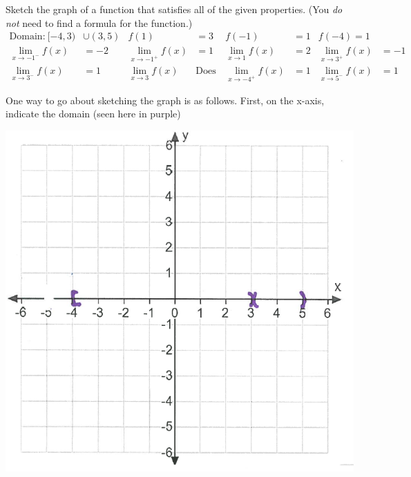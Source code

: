 \documentclass[nooutcomes]{ximera}
\begin{document}
					

\begin{problem}
Sketch the graph of a function that satisfies all of the given properties.
  (You \emph{do not} need to find a formula for the function.)
	\begin{align*}
	 \text{Domain:}\ [-4,3)&\cup(3,5)&  f(1) &= 3 & f(-1) &= 1& f(-4)=1\\
	 \lim_{x \to -1^-} f(x) &= -2 & \lim_{x \to -1^+} f(x) &= 1 &   \lim_{x \to 1} f(x) &= 2&  \lim_{x \to 3^+} f(x) &=-1\\
	\lim_{x \to 3^-} f(x)&=1&\lim_{x \to 3} f(x)\ & \text{Does Not Exist} & \lim_{x \to -4^+} f(x) &= 1 &  \lim_{x \to 5^-} f(x) &= 1
	\end{align*}
	\begin{freeResponse} 
	One way to go about sketching the graph is as follows.  First, on the x-axis, indicate the domain (seen here in purple)
	    \begin{image}
	\includegraphics[scale=.5]{"Sketching stage 1"}
    \end{image}


\end{freeResponse}
\end{problem}
\end{document}
